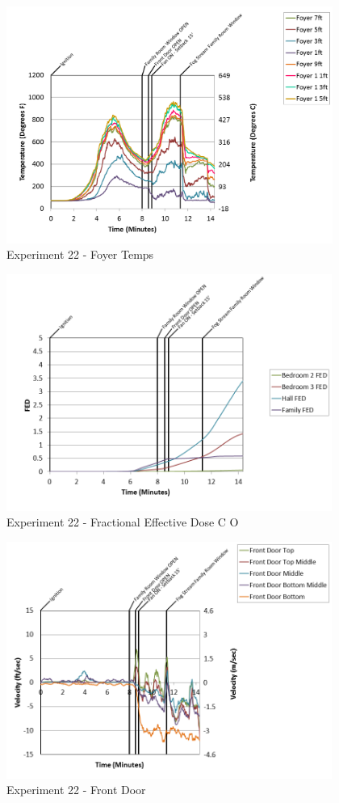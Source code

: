 \documentclass{article}
\begin{document}
\begin{appendices}
\clearpage

\begin{figure}[h!]
	\centering
	\includegraphics[height=3.05in]{0_Images/Results_Charts/Exp_22_Charts/FoyerTemps.png}
	\caption{Experiment 22 - Foyer Temps}
\end{figure}


\begin{figure}[h!]
	\centering
	\includegraphics[height=3.05in]{0_Images/Results_Charts/Exp_22_Charts/FractionalEffectiveDoseCO.png}
	\caption{Experiment 22 - Fractional Effective Dose C O}
\end{figure}

\clearpage

\begin{figure}[h!]
	\centering
	\includegraphics[height=3.05in]{0_Images/Results_Charts/Exp_22_Charts/FrontDoor.png}
	\caption{Experiment 22 - Front Door}
\end{figure}



\end{appendices}
\end{document}
